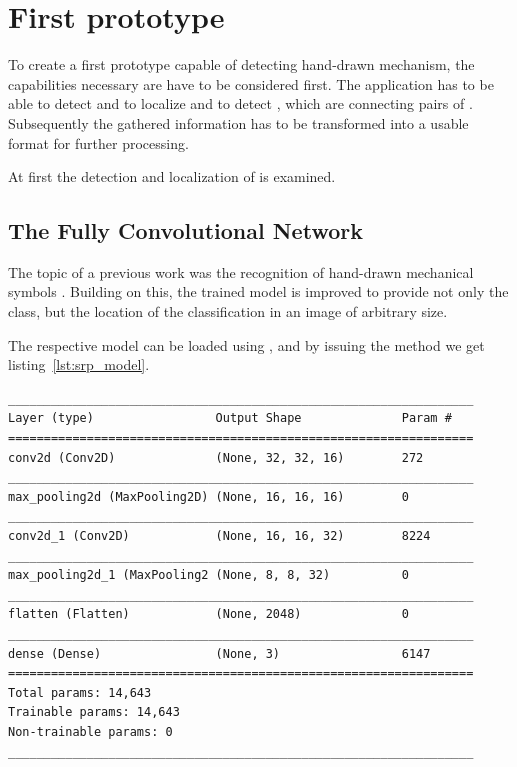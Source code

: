 \section{First prototype} \label{ch:first_prototype}

To create a first prototype capable of detecting hand-drawn mechanism, the capabilities necessary are have to be considered first.
The application has to be able to detect and to localize  and to detect , which are connecting pairs of .
Subsequently the gathered information has to be transformed into a usable format for further processing.

At first the detection and localization of  is examined.

\subsection{The Fully Convolutional Network}\label{ch:fcn}

The topic of a previous work was the recognition of hand-drawn mechanical symbols \cite{Lawrence2020}.
Building on this, the trained model is improved to provide not only the class, but the location of the classification in an image of arbitrary size.

The respective model can be loaded using , %
 and by issuing the  method we get listing~\ref{lst:srp_model}.

\begin{lstlisting}[caption={Summary of Symbol Classifier.}, label={lst:srp_model}]
_________________________________________________________________
Layer (type)                 Output Shape              Param #
=================================================================
conv2d (Conv2D)              (None, 32, 32, 16)        272
_________________________________________________________________
max_pooling2d (MaxPooling2D) (None, 16, 16, 16)        0
_________________________________________________________________
conv2d_1 (Conv2D)            (None, 16, 16, 32)        8224
_________________________________________________________________
max_pooling2d_1 (MaxPooling2 (None, 8, 8, 32)          0
_________________________________________________________________
flatten (Flatten)            (None, 2048)              0
_________________________________________________________________
dense (Dense)                (None, 3)                 6147
=================================================================
Total params: 14,643
Trainable params: 14,643
Non-trainable params: 0
_________________________________________________________________
\end{lstlisting}

